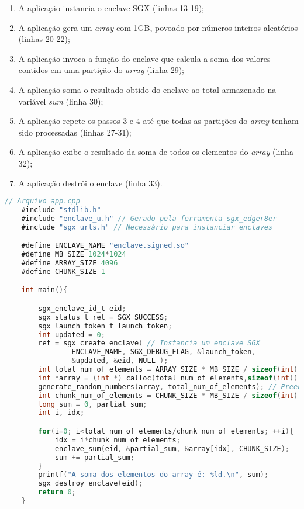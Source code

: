 \begin{enumerate}
    \item A aplicação instancia o enclave SGX (linhas 13-19);
    \item A aplicação gera um \textit{array} com 1GB, povoado por números
    inteiros aleatórios (linhas 20-22);
    \item A aplicação invoca a função do enclave que calcula a soma dos valores
    contidos em uma partição do \textit{array} (linha 29);
    \item A aplicação soma o resultado obtido do enclave ao total armazenado na
    variável \textit{sum} (linha 30);
    \item A aplicação repete os passos 3 e 4 até que todas as partições do
    \textit{array} tenham sido processadas (linhas 27-31);
    \item A aplicação exibe o resultado da soma de todos os elementos do \textit
    {array} (linha 32);
    \item A aplicação destrói o enclave (linha 33).
\end{enumerate}

\begin{lstlisting}[language=C, label=lst:arquivo_app_cpp, caption={Arquivo
contendo a implementação da parte insegura da aplicação SGX.}]
    // Arquivo app.cpp
    #include "stdlib.h"
    #include "enclave_u.h" // Gerado pela ferramenta sgx_edger8er
    #include "sgx_urts.h" // Necessário para instanciar enclaves

    #define ENCLAVE_NAME "enclave.signed.so"
    #define MB_SIZE 1024*1024
    #define ARRAY_SIZE 4096
    #define CHUNK_SIZE 1

    int main(){

        sgx_enclave_id_t eid;
        sgx_status_t ret = SGX_SUCCESS;
        sgx_launch_token_t launch_token;
        int updated = 0;
        ret = sgx_create_enclave( // Instancia um enclave SGX
                ENCLAVE_NAME, SGX_DEBUG_FLAG, &launch_token,
                &updated, &eid, NULL );
        int total_num_of_elements = ARRAY_SIZE * MB_SIZE / sizeof(int);
        int *array = (int *) calloc(total_num_of_elements,sizeof(int));
        generate_random_numbers(array, total_num_of_elements); // Preenche array com números inteiros aleatórios
        int chunk_num_of_elements = CHUNK_SIZE * MB_SIZE / sizeof(int);
        long sum = 0, partial_sum;
        int i, idx;

        for(i=0; i<total_num_of_elements/chunk_num_of_elements; ++i){
            idx = i*chunk_num_of_elements;
            enclave_sum(eid, &partial_sum, &array[idx], CHUNK_SIZE);
            sum += partial_sum;
        }
        printf("A soma dos elementos do array é: %ld.\n", sum);
        sgx_destroy_enclave(eid);
        return 0;
    }
\end{lstlisting}